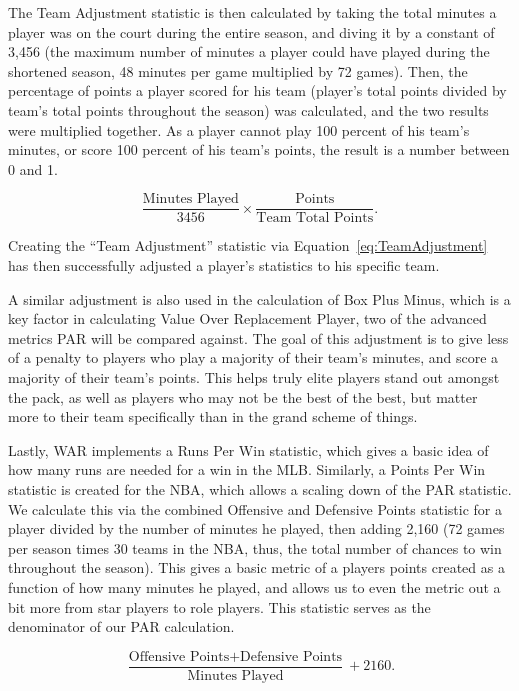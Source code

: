 \documentclass[12pt]{article}
\begin{document}
The Team Adjustment statistic 
is then calculated by taking the total minutes a player was on the court 
during the entire season, and diving 
it by a constant of 3,456 (the maximum number of minutes a player could 
have played during the shortened 
season, 48 minutes per game multiplied by 72 games). Then, the 
percentage of points a player scored for 
his team (player's total points divided by team's total points throughout the 
season) was calculated, and the 
two results were multiplied together. As a player cannot play 100 percent 
of his team's minutes, or score 
100 percent of his team's points, the result is a number between 0 and 1. 

\begin{equation}
\label{eq:TeamAdjustment}
  \frac{\text{Minutes Played}}{3456} \times
  \frac{\text{Points}}{\text{Team Total Points}}.
\end{equation}

Creating the ``Team Adjustment'' statistic via 
Equation~\eqref{eq:TeamAdjustment} has then successfully adjusted a 
player's statistics to his specific team.

A similar adjustment is also used 
in the calculation of Box Plus Minus, which is a key factor in calculating 
Value Over Replacement Player, 
two of the advanced metrics PAR will be compared against. The goal of 
this adjustment is to give less of a 
penalty to players who play a majority of their team's minutes, and score a 
majority of their team's points. 
This helps truly elite players stand out amongst the pack, as well as 
players who may not be the best of the 
best, but matter more to their team specifically than in the grand scheme 
of things.

Lastly, WAR implements a Runs Per Win statistic, which gives a basic 
idea of how many runs are needed 
for a win in the MLB. Similarly, a Points Per Win statistic is created for the 
NBA, which allows a scaling 
down of the PAR statistic. We calculate this via the combined Offensive 
and Defensive Points statistic for a 
player divided by the number of minutes he played, then adding 2,160 (72 
games per season times 30 
teams in the NBA, thus, the total number of chances to win throughout the 
season). This gives a basic 
metric of a players points created as a function of how many minutes he 
played, and allows us to even the 
metric out a bit more from star players to role players. This statistic serves 
as the denominator of our PAR 
calculation.

\begin{equation}
\label{eq:PointsPerWin}
 \frac{\text{Offensive Points} + \text{Defensive Points}} {\text{Minutes 
Played}} + 2160.
\end{equation}
\end{document}
